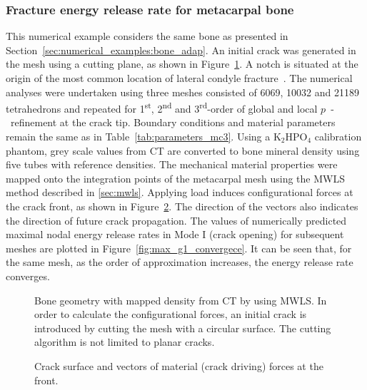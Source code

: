 \documentclass[review]{elsarticle}
\numberwithin{equation}{section}
\begin{document}
\subsubsection{Fracture energy release rate for metacarpal bone} \label{sec:mc3_release_eng}
This numerical example considers the same bone as presented in Section~\ref{sec:numerical_examples:bone_adap}. 
An initial crack was generated in the mesh using a cutting plane, as shown in Figure~\ref{fig:bone_ct_mesh_cut}. A notch is situated at the origin of the most common location of lateral condyle fracture~\citep{jacklin2012frequency}. 
The numerical analyses were undertaken using three meshes consisted of 6069, 10032 and 21189 tetrahedrons and repeated for 1\textsuperscript{st}, 2\textsuperscript{nd} and 3\textsuperscript{rd}-order of global and local $p$~-~refinement at the crack tip. 
Boundary conditions and material parameters remain the same as in Table~\ref{tab:parameters_mc3}. 
Using a $\mathrm {K_2 HPO_4}$ calibration phantom, grey scale values from CT are converted to bone mineral density using five tubes with reference densities. 
The mechanical material properties were mapped onto the integration points of the metacarpal mesh using the MWLS method described in \ref{sec:mwls}. 
Applying load induces configurational forces at the crack front, as shown in Figure~\ref{fig:crackfrontforce}. 
The direction of the vectors also indicates the direction of future crack propagation.
The values of numerically predicted maximal nodal energy release rates in Mode I (crack opening) for subsequent meshes are plotted in Figure~\ref{fig:max_g1_convergece}. 
It can be seen that, for the same mesh, as the order of approximation increases, the energy release rate converges. 
\begin{figure}[h]
	\centering
		\def\svgwidth{10cm}
		
	\caption{Bone geometry with mapped density from CT by using MWLS. In order to calculate the configurational forces, an initial crack is introduced by cutting the mesh with a circular surface. The cutting algorithm is not limited to planar cracks. }
	\label{fig:bone_ct_mesh_cut}
\end{figure}

\begin{figure}[h!]
	\centering
	\def\svgwidth{12cm}
	
	\caption{Crack surface and vectors of material (crack driving) forces at the front.}
	\label{fig:crackfrontforce}
\end{figure}
\end{document}
